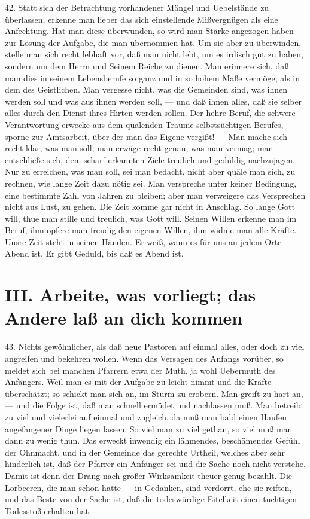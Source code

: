 42. Statt sich der Betrachtung vorhandener Mängel und Uebelstände zu überlassen, erkenne man lieber das sich
einstellende Mißvergnügen als eine Anfechtung. Hat man diese überwunden, so wird man Stärke angezogen haben zur Lösung der Aufgabe, die man übernommen hat. Um sie aber zu überwinden, stelle man sich recht lebhaft vor, daß man nicht lebt, um es irdisch gut zu haben, sondern um dem Herrn und Seinem Reiche zu dienen. Man erinnere sich, daß man dies in seinem Lebensberufe so ganz und in so hohem Maße vermöge, als in dem des Geistlichen. Man vergesse nicht, was die Gemeinden sind, was ihnen werden soll und was aus ihnen werden soll, — und daß ihnen alles, daß sie selber alles durch den Dienst ihres Hirten werden sollen. Der hehre Beruf, die schwere Verantwortung erwecke aus dem quälenden Traume selbstsüchtigen Berufes, sporne zur Amtsarbeit, über der man das Eigene vergißt! — Man mache sich recht klar, was man soll; man erwäge recht genau, was man vermag; man entschließe sich, dem scharf erkannten Ziele treulich und geduldig nachzujagen. Nur zu erreichen, was man soll, sei man bedacht, nicht aber quäle man sich, zu rechnen, wie lange Zeit dazu nötig sei. Man verspreche unter keiner Bedingung, eine bestimmte Zahl von Jahren zu bleiben; aber man verweigere das Versprechen nicht aus Lust, zu gehen. Die Zeit komme gar nicht in Anschlag. So lange Gott will, thue man stille und treulich, was Gott will. Seinen Willen erkenne man im Beruf, ihm opfere man freudig den eigenen Willen, ihm widme man alle Kräfte. Unsre Zeit steht in seinen Händen. Er weiß, wann es für uns an jedem Orte Abend ist. Er gibt Geduld, bis daß es Abend ist.

\section[III. Arbeite, was vorliegt]{III. Arbeite, was vorliegt; das Andere laß an dich kommen}

43. Nichts gewöhnlicher, als daß neue Pastoren auf einmal alles, oder doch zu viel angreifen und bekehren wollen. Wenn das Versagen des Anfangs vorüber, so meldet sich bei manchen Pfarrern etwa der Muth, ja wohl Uebermuth des Anfängers. Weil man es mit der Aufgabe zu leicht nimmt und die Kräfte überschätzt; so schickt man sich an, im Sturm zu erobern. Man greift zu hart an, — und die Folge ist, daß man schnell ermüdet und nachlassen muß. Man betreibt zu viel und vielerlei auf einmal und zugleich, da muß man bald einen Haufen angefangener Dinge liegen lassen. So viel man zu viel gethan, so viel muß man dann zu wenig thun. Das erweckt inwendig ein lähmendes, beschämendes Gefühl der Ohnmacht, und in der Gemeinde das gerechte Urtheil, welches aber sehr hinderlich ist, daß der Pfarrer ein Anfänger sei und die Sache noch nicht verstehe. Damit ist denn der Drang nach großer Wirksamkeit theuer genug bezahlt. Die Lorbeeren, die man schon hatte — in Gedanken, sind verdorrt, ehe sie reiften, und das Beste von der Sache ist, daß die todeswürdige Eitelkeit einen tüchtigen Todesstoß erhalten hat.

